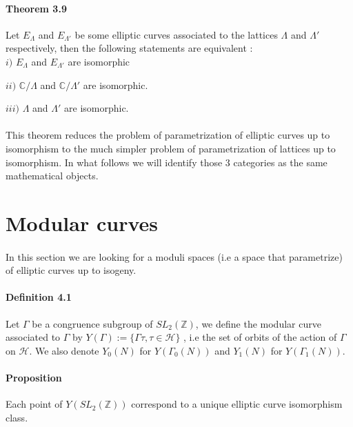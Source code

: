 \documentclass[letterpaper,10pt]{article}
\begin{document}
\paragraph{Theorem 3.9} Let $E_{\Lambda}$ and $E_{\Lambda'}$ be some elliptic curves associated to the lattices $\Lambda$ and $\Lambda'$ respectively,
then the following statements are equivalent :\\

  $i)$ $E_{\Lambda}$ and $E_{\Lambda'}$ are isomorphic
  
  $ii)$  $\mathbb{C}/\Lambda$ and $\mathbb{C}/\Lambda'$ are isomorphic.
  
  $iii)$  $\Lambda$ and $\Lambda'$ are isomorphic. \\ 
  
{\itshape \paragraph{}This theorem reduces the problem of parametrization of elliptic curves up to isomorphism to the much simpler problem of parametrization of
 lattices up to isomorphism. In what follows we will identify those 3 categories as the same mathematical objects.
}

\section{Modular curves}%

{\itshape \paragraph{} In this section we are looking for a moduli spaces (i.e a space that parametrize) of elliptic curves up to isogeny. 
}



\paragraph{Definition 4.1} Let $\Gamma$ be a congruence subgroup of $SL_2(\mathbb{Z})$, we define the modular curve associated to $\Gamma$ by
 $Y(\Gamma) := \{ \Gamma\tau , \tau \in \mathcal{H} \}$ , i.e the set of orbits of the action of $\Gamma$ on $\mathcal{H}$. We also denote $Y_0(N)$ for $Y(\Gamma_0(N))$
 and $Y_1(N)$ for $Y(\Gamma_1(N))$.


\paragraph{Proposition } Each point of $Y(SL_2(\mathbb{Z}))$ correspond to a unique elliptic curve isomorphism class.
\end{document}
